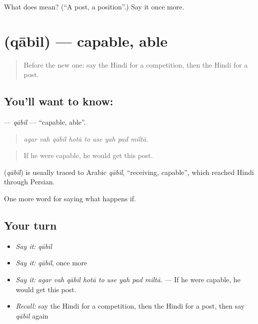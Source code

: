 \begin{tcolorbox}[breakable,colback=teal!4,colframe=teal!35!black,title={Before you move on}]
What does  mean? (\textquotedblleft{}A post, a position\textquotedblright{}.) Say it once more.
\end{tcolorbox}
\section[\texorpdfstring{\hi{क़ाबिल} (qābil)}{क़ाबिल (qābil)}]{ (qābil) — capable, able}

\label{lesson:HI-C394-qabil}



\begin{quote}
Before the new one: say the Hindi for a competition, then the Hindi for a post.
\end{quote}

\subsection*{You'll want to know: }
\textbf{} — \emph{qābil} — \textquotedblleft{}capable, able\textquotedblright{}.

\begin{quote}
        
\end{quote}

\begin{quote}
\emph{agar vah qābil hotā to use yah pad miltā.}
\end{quote}

\begin{quote}
If he were capable, he would get this post.
\end{quote}

\begin{cousinweb}
\textbf{} (\emph{qābil}) is usually traced to Arabic \emph{qābil}, \textquotedblleft{}receiving, capable\textquotedblright{}, which reached Hindi through Persian.
\end{cousinweb}

\begin{grammarlens}[title={What you've built}]
One more word for saying what happens if.
\end{grammarlens}

\subsection*{Your turn}
\begin{itemize}
\raggedright
  \item \emph{Say it:} \emph{qābil}
  \item \emph{Say it:} \emph{qābil}, once more
  \item \emph{Say it:} \emph{agar vah qābil hotā to use yah pad miltā.} — If he were capable, he would get this post.
  \item \emph{Recall:} say the Hindi for a competition, then the Hindi for a post, then say \emph{qābil} again
\end{itemize}

